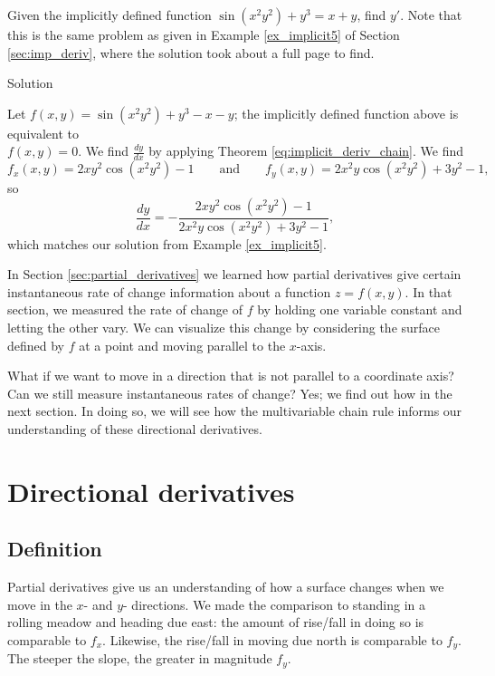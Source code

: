 \begin{example}\label{ex_mchain5}
Given the implicitly defined function $\sin(x^2y^2)+y^3=x+y$, find $y'$. Note that this is the same problem as given in Example \ref{ex_implicit5} of Section \ref{sec:imp_deriv}, where the solution took about a full page to find.

Solution 

Let $f(x,y) = \sin(x^2y^2)+y^3-x-y$; the implicitly defined function above is equivalent to \\$f(x,y)=0$. We find $\frac{dy}{dx}$ by applying Theorem \ref{eq:implicit_deriv_chain}. We find 
$$f_x(x,y) = 2xy^2\cos(x^2y^2)-1\qquad \text{and}\qquad f_y(x,y) = 2x^2y\cos(x^2y^2)+3y^2-1,$$
so 
$$\frac{dy}{dx} = -\frac{2xy^2\cos(x^2y^2)-1}{2x^2y\cos(x^2y^2)+3y^2-1},$$
which matches our solution from Example \ref{ex_implicit5}.
\end{example}
\fi

In Section \ref{sec:partial_derivatives} we learned how partial derivatives give certain instantaneous rate of change information about a function $z=f(x,y)$. In that section, we measured the rate of change of $f$ by holding one variable constant and letting the other vary. We can visualize this change by considering the surface defined by $f$ at a point and moving parallel to the $x$-axis.

What if we want to move in a direction that is not parallel to a coordinate axis? Can we still measure instantaneous rates of change? Yes; we find out how in the next section. In doing so, we will see how the multivariable chain rule informs our understanding of these directional derivatives.

\section{Directional derivatives}\label{sec:directional_derivative}
\subsection{Definition}
	\checkoddpage
{}
Partial derivatives give us an understanding of how a surface changes when we move in the $x$- and $y$- directions. We made the comparison to standing in a rolling meadow and heading due east: the amount of rise/fall in doing so is comparable to $f_x$. Likewise, the rise/fall in  moving due north is comparable to $f_y$. The steeper the slope, the greater in magnitude $f_y$.

